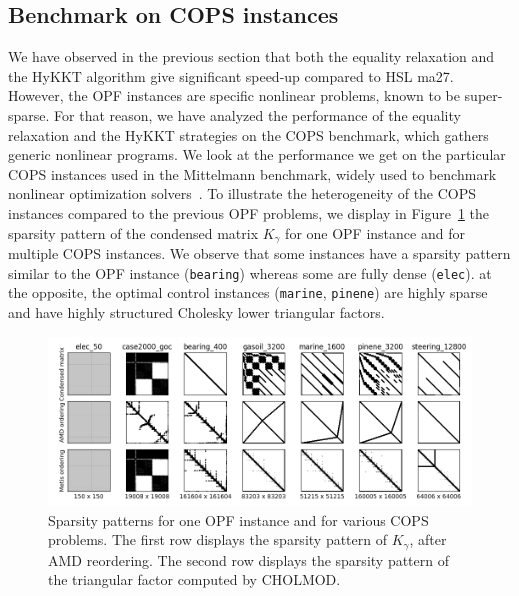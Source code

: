 \subsection{Benchmark on COPS instances}
We have observed in the previous section that both the equality relaxation
and the HyKKT algorithm give significant speed-up compared to HSL ma27.
However, the OPF instances are specific nonlinear problems, known to be
super-sparse. For that reason, we have analyzed the performance of
the equality relaxation and the HyKKT strategies on the COPS benchmark,
which gathers generic nonlinear programs.
We look at the performance we get on the particular COPS instances used in
the Mittelmann benchmark, widely used to benchmark nonlinear optimization
solvers~\cite{mittelmann2002benchmark}.
To illustrate the heterogeneity of the COPS instances compared to the
previous OPF problems, we display in Figure~\ref{fig:cops:nnz} the sparsity pattern of the
condensed matrix $K_\gamma$ for one OPF instance and for multiple
COPS instances. We observe that some instances have a sparsity pattern
similar to the OPF instance ({\tt bearing}) whereas some are fully dense ({\tt elec}).
at the opposite, the optimal control instances ({\tt marine}, {\tt pinene}) are
highly sparse and have highly structured Cholesky lower triangular factors.

\begin{figure}[!ht]
  \centering
  \includegraphics[width=.9\textwidth]{../figures/sparsity_pattern.png}
  \caption{Sparsity patterns for one OPF instance and for various
    COPS problems. The first row displays the sparsity pattern
    of $K_\gamma$, after AMD reordering. The second row displays
    the sparsity pattern of the triangular factor computed by CHOLMOD.
    \label{fig:cops:nnz}
  }
\end{figure}


